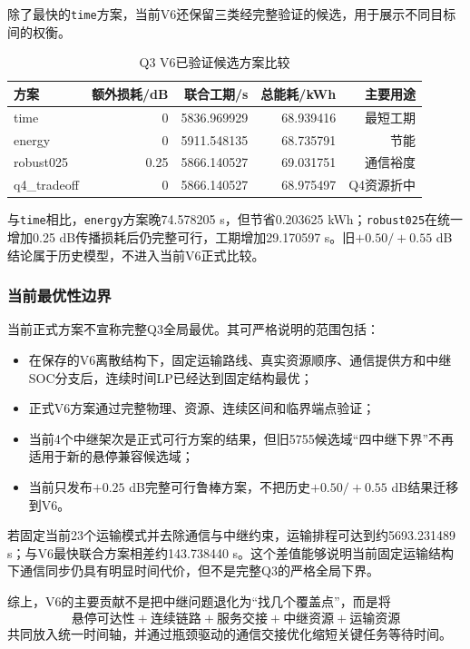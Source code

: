 \documentclass[UTF8,a4paper,12pt]{ctexart}
\begin{document}
除了最快的\texttt{time}方案，当前V6还保留三类经完整验证的候选，用于展示不同目标间的权衡。

\begin{table}[H]
\centering
\caption{Q3 V6已验证候选方案比较}
\label{tab:q3_v6_candidates}
\begin{tabular}{lrrrr}
\toprule
方案 & 额外损耗/dB & 联合工期/s & 总能耗/kWh & 主要用途\\
\midrule
time & 0 & 5836.969929 & 68.939416 & 最短工期\\
energy & 0 & 5911.548135 & 68.735791 & 节能\\
robust025 & 0.25 & 5866.140527 & 69.031751 & 通信裕度\\
q4\_tradeoff & 0 & 5866.140527 & 68.975497 & Q4资源折中\\
\bottomrule
\end{tabular}
\end{table}

与\texttt{time}相比，\texttt{energy}方案晚74.578205 s，但节省0.203625 kWh；\texttt{robust025}在统一增加0.25 dB传播损耗后仍完整可行，工期增加29.170597 s。旧$+0.50/+0.55$ dB结论属于历史模型，不进入当前V6正式比较。

\subsubsection{当前最优性边界}

当前正式方案不宣称完整Q3全局最优。其可严格说明的范围包括：

\begin{itemize}
  \item 在保存的V6离散结构下，固定运输路线、真实资源顺序、通信提供方和中继SOC分支后，连续时间LP已经达到固定结构最优；
  \item 正式V6方案通过完整物理、资源、连续区间和临界端点验证；
  \item 当前4个中继架次是正式可行方案的结果，但旧5755候选域“四中继下界”不再适用于新的悬停兼容候选域；
  \item 当前只发布$+0.25$ dB完整可行鲁棒方案，不把历史$+0.50/+0.55$ dB结果迁移到V6。
\end{itemize}

若固定当前23个运输模式并去除通信与中继约束，运输排程可达到约5693.231489 s；与V6最快联合方案相差约143.738440 s。这个差值能够说明当前固定运输结构下通信同步仍具有明显时间代价，但不是完整Q3的严格全局下界。

综上，V6的主要贡献不是把中继问题退化为“找几个覆盖点”，而是将
\[
\boxed{
\text{悬停可达性}
+
\text{连续链路}
+
\text{服务交接}
+
\text{中继资源}
+
\text{运输资源}
}
\]
共同放入统一时间轴，并通过瓶颈驱动的通信交接优化缩短关键任务等待时间。
\end{document}
